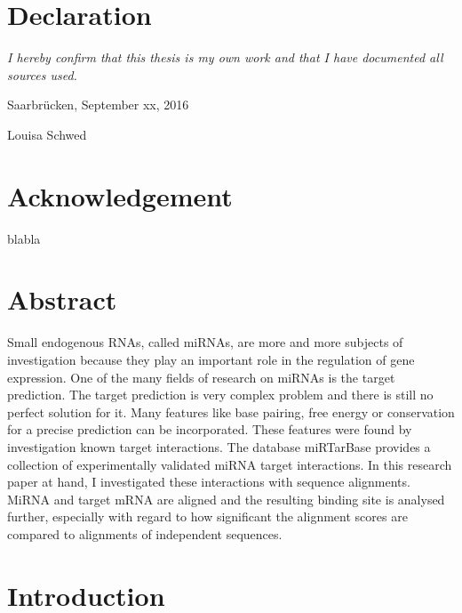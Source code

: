 \documentclass[12pt]{article}
\begin{document}
\section*{Declaration}
\emph{I hereby confirm that this thesis is my own work and that I have documented all sources used.}

\vspace{1cm}

\noindent Saarbr\"ucken, September xx, 2016
\vspace{1.5cm}

\noindent Louisa Schwed
\newpage
\mbox{}

\section*{Acknowledgement}
blabla

\newpage


\tableofcontents

\newpage 
\pagestyle{plain}



\section*{Abstract}

Small endogenous RNAs, called miRNAs, are more and more subjects of investigation because they play an important role in the regulation of gene expression. One of the many fields of research on miRNAs is the target prediction. The target prediction is very complex problem and there is still no perfect solution for it. Many features like base pairing, free energy or conservation for a precise prediction can be incorporated. These features were found by investigation known target interactions. The database miRTarBase provides a collection of experimentally validated miRNA target interactions. In this research paper at hand, I investigated these interactions with sequence alignments. MiRNA and target mRNA are aligned and the resulting binding site is analysed further, especially with regard to how significant the alignment scores are compared to alignments of independent sequences.
 
 
\vspace{1.5cm}


\section{Introduction}
\end{document}
